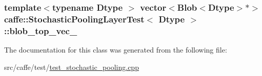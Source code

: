 \hypertarget{classcaffe_1_1_stochastic_pooling_layer_test_ac5a8fb017528e7853a1e921a6e475062}{
\subsubsection[{blob\+\_\+top\+\_\+vec\+\_\+}]{\setlength{\rightskip}{0pt plus 5cm}template$<$typename Dtype $>$ vector$<${\bf Blob}$<$Dtype$>$$\ast$$>$ {\bf caffe\+::\+Stochastic\+Pooling\+Layer\+Test}$<$ Dtype $>$\+::blob\+\_\+top\+\_\+vec\+\_\+\hspace{0.3cm}{\ttfamily [protected]}}}\label{classcaffe_1_1_stochastic_pooling_layer_test_ac5a8fb017528e7853a1e921a6e475062}


The documentation for this class was generated from the following file\+:\begin{DoxyCompactItemize}
\item 
src/caffe/test/\hyperlink{test__stochastic__pooling_8cpp}{test\+\_\+stochastic\+\_\+pooling.\+cpp}\end{DoxyCompactItemize}
